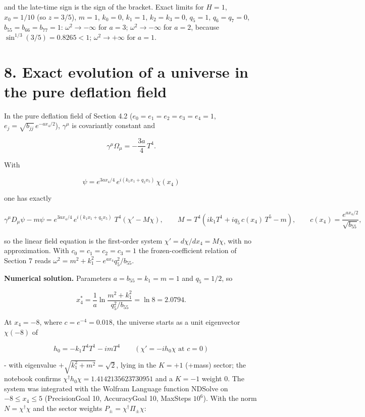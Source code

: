 \documentclass[10pt]{article}
\makeatletter
\newcommand\keepnext{\par\nopagebreak\@nobreaktrue\everypar{\@nobreakfalse\everypar{}}}
\newcommand\mdneed[1]{\par\if@nobreak\else\begingroup\setlength{\dimen@}{#1}\dimen@ii\pagegoal\advance\dimen@ii-\pagetotal
  \ifdim\dimen@>\dimen@ii\ifdim\dimen@ii>\z@\vfil\fi\break\fi\endgroup\fi}
\makeatother
\begin{document}
and the late-time sign is the sign of the bracket. Exact limits for $H = 1$, $x_0 = 1/10$ (so $z = 3/5$), $m = 1$, $k_0 = 0$, $k_1 = 1$, $k_2 = k_3 = 0$, $q_5 = 1$, $q_6 = q_7 = 0$, $b_{55} = b_{66} = b_{77} = 1$: $\omega^2 \to -\infty$ for $a = 3$; $\omega^2 \to -\infty$ for $a = 2$, because $\sin^{1/3}(3/5) = 0.8265 < 1$; $\omega^2 \to +\infty$ for $a = 1$.


\section*{8. Exact evolution of a universe in the pure deflation field}

In the pure deflation field of Section 4.2 ($e_0 = e_1 = e_2 = e_3 = e_4 = 1$, $e_j = \sqrt{b_{jj}}\,e^{-ax_4/2}$), $\gamma^\mu$ is covariantly constant and\keepnext


\[
\gamma^\mu\Omega_\mu = -\frac{3a}{4}\,T^4 .
\]

With\keepnext


\[
\psi = e^{3ax_4/4}\,e^{i(k_1x_1 + q_5x_5)}\,\chi(x_4)
\]

one has exactly\keepnext


\[
\gamma^\mu D_\mu\psi - m\psi = e^{3ax_4/4}\,e^{i(k_1x_1 + q_5x_5)}\;T^4\left(\chi' - M\chi\right), \qquad M = T^4\left(ik_1T^1 + iq_5\,c(x_4)\,T^5 - m\right), \qquad c(x_4) = \frac{e^{ax_4/2}}{\sqrt{b_{55}}} ,
\]

so the linear field equation is the first-order system $\chi' = d\chi/dx_4 = M\chi$, with no approximation. With $c_0 = c_1 = c_2 = c_3 = 1$ the frozen-coefficient relation of Section 7 reads $\omega^2 = m^2 + k_1^2 - e^{ax_4}q_5^2/b_{55}$.


\textbf{Numerical solution.} Parameters $a = b_{55} = k_1 = m = 1$ and $q_5 = 1/2$, so\keepnext


\[
x_4^* = \frac1a\ln\frac{m^2 + k_1^2}{q_5^2/b_{55}} = \ln 8 = 2.0794 .
\]

At $x_4 = -8$, where $c = e^{-4} = 0.018$, the universe starts as a unit eigenvector $\chi(-8)$ of\keepnext


\[
h_0 = -k_1T^4T^1 - imT^4 \qquad (\chi' = -ih_0\chi \text{ at } c = 0)
\]

\mdneed{13.2\baselineskip}with eigenvalue $+\sqrt{k_1^2 + m^2} = \sqrt2$, lying in the $K = +1$ (+mass) sector; the notebook confirms $\chi^\dagger h_0\chi = 1.4142135623730951$ and a $K = -1$ weight $0$. The system was integrated with the Wolfram Language function NDSolve on $-8 \le x_4 \le 5$ (PrecisionGoal 10, AccuracyGoal 10, MaxSteps $10^6$). With the norm $N = \chi^\dagger\chi$ and the sector weights $P_\pm = \chi^\dagger\Pi_\pm\chi$:\keepnext
\end{document}
